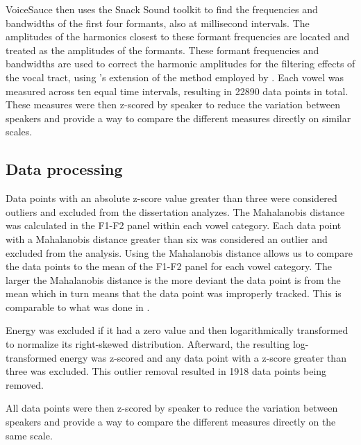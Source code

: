 VoiceSauce then uses the Snack Sound toolkit \citep{sjolanderSnackSoundToolkit2004} to find the frequencies and bandwidths of the first four formants, also at millisecond intervals. The amplitudes of the harmonics closest to these formant frequencies are located and treated as the amplitudes of the formants. These formant frequencies and bandwidths are used to correct the harmonic amplitudes for the filtering effects of the vocal tract, using \citeauthor{iseliAgeSexVowel2007}'s \citeyear{iseliAgeSexVowel2007} extension of the method employed by \citet{hansonGlottalCharacteristicsFemale1997}. Each vowel was measured across ten equal time intervals, resulting in 22890 data points in total. These measures were then z-scored by speaker to reduce the variation between speakers and provide a way to compare the different measures directly on similar scales.

\subsection{Data processing} \label{sec:acousticlandscape:data_processing}
Data points with an absolute z-score value greater than three were considered outliers and excluded from the dissertation analyzes. The Mahalanobis distance was calculated in the F1-F2 panel within each vowel category. Each data point with a Mahalanobis distance greater than six was considered an outlier and excluded from the analysis. Using the Mahalanobis distance allows us to compare the data points to the mean of the F1-F2 panel for each vowel category. The larger the Mahalanobis distance is the more deviant the data point is from the mean which in turn means that the data point was improperly tracked. This is comparable to what was done in \citet{seyfarthPlosiveVoicingAcoustics2018,chaiCheckedSyllablesChecked2022,garellekPhoneticsWhiteHmong2023}. 

Energy was excluded if it had a zero value and then logarithmically transformed to normalize its right-skewed distribution. Afterward, the resulting log-transformed energy was z-scored and any data point with a z-score greater than three was excluded. This outlier removal resulted in 1918 data points being removed. 

All data points were then z-scored by speaker to reduce the variation between speakers and provide a way to compare the different measures directly on the same scale.

